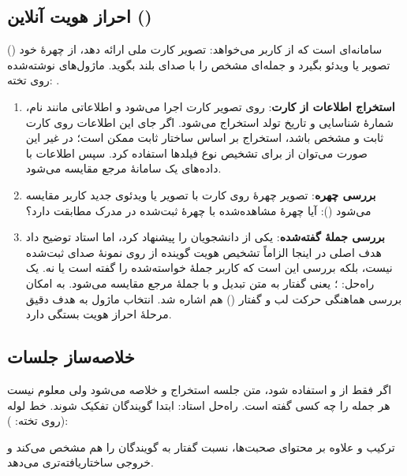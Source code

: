 \subsection{احراز هویت آنلاین ()}
 () سامانه‌ای است که از کاربر می‌خواهد: تصویر کارت ملی ارائه دهد، از چهرهٔ خود تصویر یا ویدئو بگیرد و جمله‌ای مشخص را با صدای بلند بگوید. ماژول‌های نوشته‌شده روی تخته: .
\begin{enumerate}
  \item \textbf{استخراج اطلاعات از کارت}:  روی تصویر کارت اجرا می‌شود و اطلاعاتی مانند نام، شمارهٔ شناسایی و تاریخ تولد استخراج می‌شود. اگر جای این اطلاعات روی کارت ثابت و مشخص باشد، استخراج بر اساس ساختار ثابت ممکن است؛ در غیر این صورت می‌توان از  برای تشخیص نوع فیلدها استفاده کرد. سپس اطلاعات با داده‌های یک سامانهٔ مرجع مقایسه می‌شود.
  \item \textbf{بررسی چهره}: تصویر چهرهٔ روی کارت با تصویر یا ویدئوی جدید کاربر مقایسه می‌شود (): آیا چهرهٔ مشاهده‌شده با چهرهٔ ثبت‌شده در مدرک مطابقت دارد؟
  \item \textbf{بررسی جملهٔ گفته‌شده}: یکی از دانشجویان  را پیشنهاد کرد، اما استاد توضیح داد هدف اصلی در اینجا الزاماً تشخیص هویت گوینده از روی نمونهٔ صدای ثبت‌شده نیست، بلکه بررسی این است که کاربر جملهٔ خواسته‌شده را گفته است یا نه. یک راه‌حل: ؛ یعنی گفتار به متن تبدیل و با جملهٔ مرجع مقایسه می‌شود. به امکان بررسی هماهنگی حرکت لب و گفتار () هم اشاره شد. انتخاب ماژول به هدف دقیق مرحلهٔ احراز هویت بستگی دارد.
\end{enumerate}

\subsection{خلاصه‌ساز جلسات}
اگر فقط از  و  استفاده شود، متن جلسه استخراج و خلاصه می‌شود ولی معلوم نیست هر جمله را چه کسی گفته است. راه‌حل استاد: ابتدا گویندگان تفکیک شوند. خط لوله (روی تخته: ):
\begin{center}
\end{center}
ترکیب  و  علاوه بر محتوای صحبت‌ها، نسبت گفتار به گویندگان را هم مشخص می‌کند و خروجی ساختاریافته‌تری می‌دهد.


